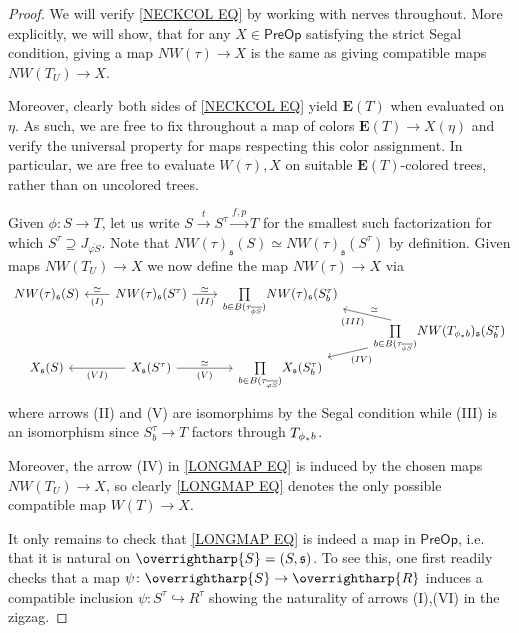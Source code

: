 \documentclass[a4paper,10pt
,draft
]{article}%
\numberwithin{equation}{section}
\numberwithin{figure}{section}
\theoremstyle{definition} %
\newcommand{\vect}[1]{\text{\overrightharp{\ensuremath{#1}}}}
\newcommand{\1}{\ensuremath{\mathbbm 1}}%
\begin{document}
\begin{proof}
	We will verify \eqref{NECKCOL EQ}
	by working with nerves throughout.
	More explicitly, 
	we will show, that for any $X\in \mathsf{PreOp}$
	satisfying the strict Segal condition,
	giving a map
	$NW(\tau) \to X$
	is the same as giving compatible maps
	$NW(T_U) \to X$.

	Moreover, clearly both sides of 
	\eqref{NECKCOL EQ} yield $\boldsymbol{E}(T)$
	when evaluated on $\eta$.
	As such, we are free to fix throughout
	a map of colors $\boldsymbol{E}(T) \to X(\eta)$
	and verify the universal property 
	for maps respecting this color assignment.
	In particular, we are free to 
	evaluate $W(\tau),X$ on suitable 
	$\boldsymbol{E}(T)$-colored trees, 
	rather than on uncolored trees.

	Given $\phi \colon S \to T$,
	let us write
	$S \xrightarrow{t} S^{\tau} \xrightarrow{f,p} T$
	for the smallest such factorization for which
	$S^{\tau} 
	\supseteq 
	J_{\overline{\varphi S}}$.
	Note that
	$NW(\tau )_{\mathfrak{s}}(S)
	\simeq 
	NW(\tau )_{\mathfrak{s}}(S^{\tau})$
	by definition.
	Given maps
	$NW(T_U) \to X$
	we now define the map
	$NW(\tau) \to X$ via
\begin{equation}\label{LONGMAP EQ}
\begin{tikzcd}[column sep = 20pt, row sep=0]
	NW(\tau)_{\mathfrak{s}}(S)
&
	NW(\tau)_{\mathfrak{s}}(S^{\tau})
	\ar{l}[swap]{\simeq}{(I)}
	\ar{r}{\simeq}[swap]{(II)}
&
	\underset{b \in B( \tau_{\overline{\phi S}})}{\prod}
	NW(\tau)_{\mathfrak{s}}(S^{\tau}_b)
\\
&&&
	\underset{b \in B( \tau_{\overline{\phi S}})}{\prod}
	NW(T_{\phi_{\**}b})_{\mathfrak{s}}(S^{\tau}_b)
	\ar{lu}[swap]{\simeq}{(III)}
	\ar{ld}{(IV)}
\\
	X_{\mathfrak{s}}(S)
&
	X_{\mathfrak{s}}(S^{\tau})
	\ar{r}{\simeq}[swap]{(V)}
	\ar{l}{(VI)}
&
	\underset{b \in B(\tau_{\overline{\varphi S}})}{\prod}
	X_{\mathfrak{s}}(S^{\tau}_b)
\end{tikzcd}
\end{equation}
	where arrows (II) and (V) are isomorphims by the Segal condition
	while (III) is an isomorphism since 
	$S_b^{\tau} \to T$ factors through 
	$T_{\phi_{\**}b}$.
	
	Moreover, the arrow (IV) in \eqref{LONGMAP EQ}
	is induced by the chosen maps
	$NW(T_U) \to X$,
	so clearly 
	\eqref{LONGMAP EQ}
	denotes the only possible compatible map
	$W(T) \to X$.

	It only remains to check that
	\eqref{LONGMAP EQ}
	is indeed a map in 
	$\mathsf{PreOp}$, i.e. that it is natural on 
	$\vect{S}=(S,\mathfrak{s})$.
	To see this, one first readily checks that a map
	$\psi \colon \vect{S} \to \vect{R}$
	induces a compatible inclusion
	$\psi \colon S^{\tau} \hookrightarrow R^{\tau}$
	showing the naturality of arrows (I),(VI) 
	in the zigzag.


\end{proof}
\end{document}
